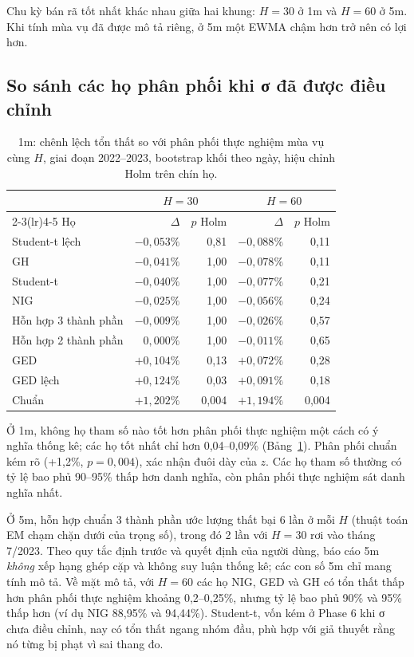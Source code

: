 \documentclass[11pt,a4paper]{article}
\begin{document}
Chu kỳ bán rã tốt nhất khác nhau giữa hai khung: $H=30$ ở 1m và $H=60$ ở 5m. Khi tính mùa vụ đã được mô tả riêng, ở 5m một EWMA chậm hơn trở nên có lợi hơn.

\subsection{So sánh các họ phân phối khi σ đã được điều chỉnh}

\begin{table}[h]
\centering
\small
\caption{1m: chênh lệch tổn thất so với phân phối thực nghiệm mùa vụ cùng $H$, giai đoạn 2022--2023, bootstrap khối theo ngày, hiệu chỉnh Holm trên chín họ.}
\label{tab:9d-ho}
\begin{tabular}{lrrrr}
\toprule
& \multicolumn{2}{c}{$H=30$} & \multicolumn{2}{c}{$H=60$} \\
\cmidrule(lr){2-3}\cmidrule(lr){4-5}
Họ & $\Delta$ & $p$ Holm & $\Delta$ & $p$ Holm \\
\midrule
Student-t lệch & $-0{,}053\%$ & 0,81 & $-0{,}088\%$ & 0,11 \\
GH & $-0{,}041\%$ & 1,00 & $-0{,}078\%$ & 0,11 \\
Student-t & $-0{,}040\%$ & 1,00 & $-0{,}077\%$ & 0,21 \\
NIG & $-0{,}025\%$ & 1,00 & $-0{,}056\%$ & 0,24 \\
Hỗn hợp 3 thành phần & $-0{,}009\%$ & 1,00 & $-0{,}026\%$ & 0,57 \\
Hỗn hợp 2 thành phần & $0{,}000\%$ & 1,00 & $-0{,}011\%$ & 0,65 \\
GED & $+0{,}104\%$ & 0,13 & $+0{,}072\%$ & 0,28 \\
GED lệch & $+0{,}124\%$ & 0,03 & $+0{,}091\%$ & 0,18 \\
Chuẩn & $+1{,}202\%$ & 0,004 & $+1{,}194\%$ & 0,004 \\
\bottomrule
\end{tabular}
\end{table}

Ở 1m, không họ tham số nào tốt hơn phân phối thực nghiệm một cách có ý nghĩa thống kê; các họ tốt nhất chỉ hơn 0,04--0,09\% (Bảng~\ref{tab:9d-ho}). Phân phối chuẩn kém rõ (+1,2\%, $p=0{,}004$), xác nhận đuôi dày của $z$. Các họ tham số thường có tỷ lệ bao phủ 90--95\% thấp hơn danh nghĩa, còn phân phối thực nghiệm sát danh nghĩa nhất.

Ở 5m, hỗn hợp chuẩn 3 thành phần ước lượng thất bại 6 lần ở mỗi $H$ (thuật toán EM chạm chặn dưới của trọng số), trong đó 2 lần với $H=30$ rơi vào tháng 7/2023. Theo quy tắc định trước và quyết định của người dùng, báo cáo 5m \emph{không} xếp hạng ghép cặp và không suy luận thống kê; các con số 5m chỉ mang tính mô tả. Về mặt mô tả, với $H=60$ các họ NIG, GED và GH có tổn thất thấp hơn phân phối thực nghiệm khoảng 0,2--0,25\%, nhưng tỷ lệ bao phủ 90\% và 95\% thấp hơn (ví dụ NIG 88,95\% và 94,44\%). Student-t, vốn kém ở Phase 6 khi σ chưa điều chỉnh, nay có tổn thất ngang nhóm đầu, phù hợp với giả thuyết rằng nó từng bị phạt vì sai thang đo.
\end{document}
